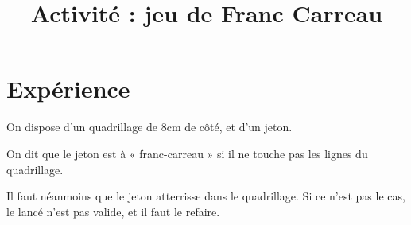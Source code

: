 \documentclass[
	classe=$2^{de}$,
]{exercice}
\title{Activité : jeu de Franc Carreau}
\begin{document}
\maketitle

\section{Expérience}

\begin{tcolorbox}
	On dispose d'un quadrillage de 8cm de côté, et d'un jeton.

	On dit que le jeton est à « franc-carreau » si il ne touche pas les lignes du quadrillage.

	Il faut néanmoins que le jeton atterrisse dans le quadrillage. Si ce n'est pas le cas, le lancé n'est pas valide, et il faut le refaire.
\end{tcolorbox}
\end{document}
